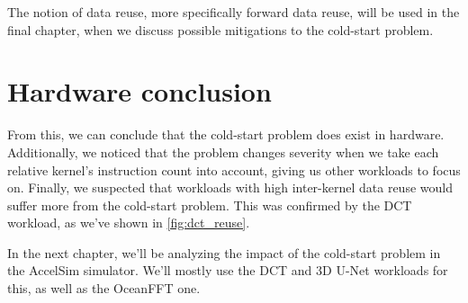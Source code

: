 The notion of data reuse, more specifically forward data reuse, will be used in the final chapter, when we discuss possible mitigations to the cold-start problem.

\FloatBarrier
\section{Hardware conclusion}\label{sec:hw-conclusion}
From this, we can conclude that the cold-start problem does exist in hardware.
Additionally, we noticed that the problem changes severity when we take each relative kernel's instruction count into account, giving us other workloads to focus on.
Finally, we suspected that workloads with high inter-kernel data reuse would suffer more from the cold-start problem.
This was confirmed by the DCT workload, as we've shown in \cref{fig:dct_reuse}.

In the next chapter, we'll be analyzing the impact of the cold-start problem in the AccelSim simulator.
We'll mostly use the DCT and 3D U-Net workloads for this, as well as the OceanFFT one.
